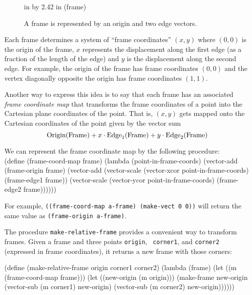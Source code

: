 \begin{figure}
 in by 2.42 in (frame)
\caption{{\protect\footnotesize A frame is represented by an origin
and two edge vectors.}}
\label{frames}
\end{figure}

Each frame determines a system of ``frame coordinates'' $(x,y)$ where
$(0,0)$ is the origin of the frame, $x$ represents the displacement
along the first edge (as a fraction of the length of the edge) and $y$ is the
displacement along the second edge.  For example, the origin of the
frame has frame coordinates $(0,0)$ and the vertex diagonally opposite
the origin has frame coordinates $(1,1)$.

Another way to express this idea is to say that each frame has an
associated {\em frame coordinate map} that transforms the frame
coordinates of a point into the Cartesian plane coordinates of the
point.  That is, $(x,y)$ gets mapped onto the Cartesian
coordinates of the point given by the vector sum
\begin{displaymath}
\hbox{\rm Origin(Frame)} + x\cdot \hbox{\rm Edge}_1\hbox{\rm (Frame)}
+ y\cdot \hbox{\rm Edge}_2\hbox{\rm (Frame)}
\end{displaymath}

We can represent the frame coordinate map by the following procedure:\\
\beginlisp
(define (frame-coord-map frame)
  (lambda (point-in-frame-coords)
    (vector-add
     (frame-origin frame)
     (vector-add (vector-scale (vector-xcor point-in-frame-coords)
                               (frame-edge1 frame))
                 (vector-scale (vector-ycor point-in-frame-coords)
                               (frame-edge2 frame))))))
\endlisp

For example, {\tt ((frame-coord-map a-frame) (make-vect 0 0))} will
return the same value as {\tt (frame-origin a-frame)}.

The procedure {\tt make-relative-frame} provides a convenient way to
transform frames.  Given a frame and three points {\tt origin}, {\tt
corner1}, and {\tt corner2} (expressed in frame coordinates), it
returns a new frame with those corners:

\beginlisp
(define (make-relative-frame origin corner1 corner2)
  (lambda (frame)
    (let ((m (frame-coord-map frame)))
      (let ((new-origin (m origin)))
        (make-frame new-origin
                    (vector-sub (m corner1) new-origin)
                    (vector-sub (m corner2) new-origin))))))
\endlisp

